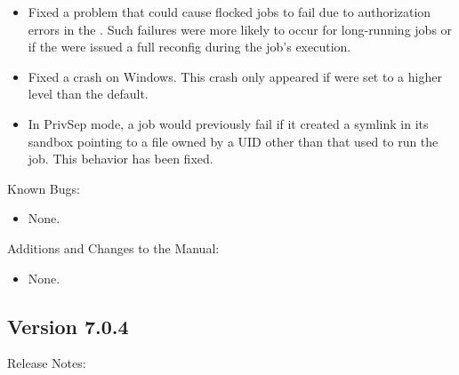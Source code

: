 \begin{itemize}
\item Fixed a problem that could cause flocked jobs to fail due to
authorization errors in the . Such failures were more
likely to occur for long-running jobs or if the  were
issued a full reconfig during the job's execution.

\item Fixed a  crash on Windows. This crash only
appeared if  were set to a higher level than
the default.

\item In PrivSep mode, a job would previously fail if it created a
symlink in its sandbox pointing to a file owned by a UID other than
that used to run the job. This behavior has been fixed.

\end{itemize}

\noindent Known Bugs:

\begin{itemize}

\item None.

\end{itemize}

\noindent Additions and Changes to the Manual:

\begin{itemize}

\item None.

\end{itemize}


\subsection*{\label{sec:New-7-0-4}Version 7.0.4}

\noindent Release Notes:


